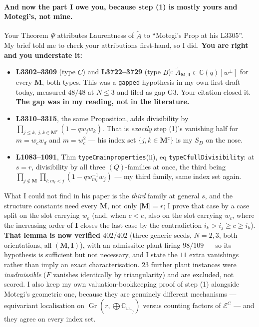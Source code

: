\documentclass[11pt]{article}
\newcommand{\At}{\widetilde{A}}
\newcommand{\bM}{\mathbf{M}}
\newcommand{\bI}{\mathbf{I}}
\begin{document}
\paragraph{And now the part I owe you, because step (1) is mostly yours and
Motegi's, not mine.}  Your Theorem $\Psi$ attributes Laurentness of $\At$ to
``Motegi's Prop at his L3305''.  My brief told me to check your attributions
first-hand, so I did.  \textbf{You are right and you understate it:}
\begin{itemize}
\item \textbf{L3302--3309} (type $C$) and \textbf{L3722--3729} (type $B$):
  $\At_{\bM,\bI}\in\mathbb C(q)[w^{\pm}]$ for every $\bM$, both types.  This was a
  \texttt{gapped} hypothesis in my own first draft today, measured $48/48$ at
  $N\le3$ and filed as gap G3.  Your citation closed it.  \textbf{The gap was in
  my reading, not in the literature.}
\item \textbf{L3310--3315}, the same Proposition, adds divisibility by
  $\prod_{j\le k,\ j,k\in\bM^{\mathrm c}}(1-qw_jw_k)$.  That is \emph{exactly}
  step (1)'s vanishing half for $m=w_cw_d$ and $m=w_c^2$ --- his index set
  $\{j,k\in\bM^{\mathrm c}\}$ is my $S_D$ on the nose.
\item \textbf{L1083--1091}, Thm \texttt{typeCmainproperties}(ii), eq
  \texttt{typeCfullDivisibility}: at $s=r$, divisibility by all three
  $(Q)$-families at once, the third being
  $\prod_{j\notin\bM}\prod_{l:m_l<j}(1-qw_{m_l}^{-1}w_j)$ --- my third family,
  same index set again.
\end{itemize}
What I could not find in his paper is the \emph{third} family at general $s$, and
the structure constants need every $\bM$, not only $|\bM|=r$; I prove that case
by a case split on the slot carrying $w_e$ (and, when $c<e$, also on the slot
carrying $w_c$, where the increasing order of $\bI$ closes the last case by the
contradiction $i_k>i_j\ge c\ge i_k$).  \textbf{That lemma is now verified
$402/402$} (three generic seeds, $N=2,3$, both orientations, all $(\bM,\bI)$), with
an admissible plant firing $98/109$ --- so its hypothesis is sufficient but not
necessary, and I state the $11$ extra vanishings rather than imply an exact
characterisation.  $23$ further plant instances were \emph{inadmissible} ($F$
vanishes identically by triangularity) and are excluded, not scored.  I also keep my own valuation-bookkeeping
proof of step (1) alongside Motegi's geometric one, because they are genuinely
different mechanisms --- equivariant localisation on
$\operatorname{Gr}(r,\bigoplus\mathbb C_{w_{m_j}})$ versus counting factors of
$\mathcal E^{C}$ --- and they agree on every index set.
\end{document}
